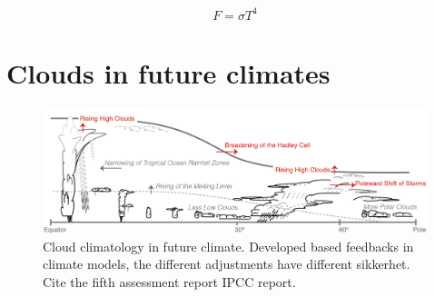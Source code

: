 \begin{equation} \label{eq:stefan-boltzmann}
    F = \sigma T ^4
\end{equation}

\section{Clouds in future climates} \label{sec:intro_cloud_future_climates}
\begin{figure}[h]
    \centering
    \includegraphics[scale = 0.8]{Chapter1_Intro/images/Fig7-11_ipcc.jpg}
    \caption{Cloud climatology in future climate. Developed based feedbacks in climate models, the different adjustments have different sikkerhet. Cite the fifth assessment report IPCC report.}
    \label{fig:cloud_scheme}
\end{figure}

